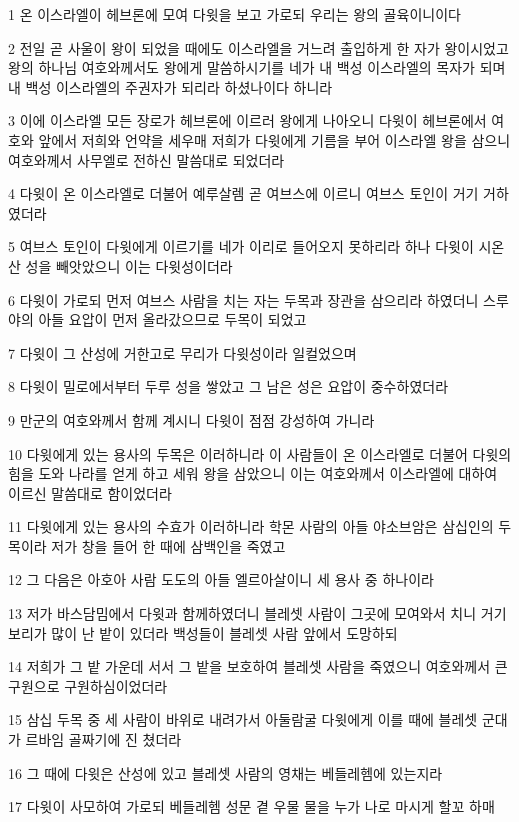 \par 1 온 이스라엘이 헤브론에 모여 다윗을 보고 가로되 우리는 왕의 골육이니이다
\par 2 전일 곧 사울이 왕이 되었을 때에도 이스라엘을 거느려 출입하게 한 자가 왕이시었고 왕의 하나님 여호와께서도 왕에게 말씀하시기를 네가 내 백성 이스라엘의 목자가 되며 내 백성 이스라엘의 주권자가 되리라 하셨나이다 하니라
\par 3 이에 이스라엘 모든 장로가 헤브론에 이르러 왕에게 나아오니 다윗이 헤브론에서 여호와 앞에서 저희와 언약을 세우매 저희가 다윗에게 기름을 부어 이스라엘 왕을 삼으니 여호와께서 사무엘로 전하신 말씀대로 되었더라
\par 4 다윗이 온 이스라엘로 더불어 예루살렘 곧 여브스에 이르니 여브스 토인이 거기 거하였더라
\par 5 여브스 토인이 다윗에게 이르기를 네가 이리로 들어오지 못하리라 하나 다윗이 시온산 성을 빼앗았으니 이는 다윗성이더라
\par 6 다윗이 가로되 먼저 여브스 사람을 치는 자는 두목과 장관을 삼으리라 하였더니 스루야의 아들 요압이 먼저 올라갔으므로 두목이 되었고
\par 7 다윗이 그 산성에 거한고로 무리가 다윗성이라 일컬었으며
\par 8 다윗이 밀로에서부터 두루 성을 쌓았고 그 남은 성은 요압이 중수하였더라
\par 9 만군의 여호와께서 함께 계시니 다윗이 점점 강성하여 가니라
\par 10 다윗에게 있는 용사의 두목은 이러하니라 이 사람들이 온 이스라엘로 더불어 다윗의 힘을 도와 나라를 얻게 하고 세워 왕을 삼았으니 이는 여호와께서 이스라엘에 대하여 이르신 말씀대로 함이었더라
\par 11 다윗에게 있는 용사의 수효가 이러하니라 학몬 사람의 아들 야소브암은 삼십인의 두목이라 저가 창을 들어 한 때에 삼백인을 죽였고
\par 12 그 다음은 아호아 사람 도도의 아들 엘르아살이니 세 용사 중 하나이라
\par 13 저가 바스담밈에서 다윗과 함께하였더니 블레셋 사람이 그곳에 모여와서 치니 거기 보리가 많이 난 밭이 있더라 백성들이 블레셋 사람 앞에서 도망하되
\par 14 저희가 그 밭 가운데 서서 그 밭을 보호하여 블레셋 사람을 죽였으니 여호와께서 큰 구원으로 구원하심이었더라
\par 15 삼십 두목 중 세 사람이 바위로 내려가서 아둘람굴 다윗에게 이를 때에 블레셋 군대가 르바임 골짜기에 진 쳤더라
\par 16 그 때에 다윗은 산성에 있고 블레셋 사람의 영채는 베들레헴에 있는지라
\par 17 다윗이 사모하여 가로되 베들레헴 성문 곁 우물 물을 누가 나로 마시게 할꼬 하매
